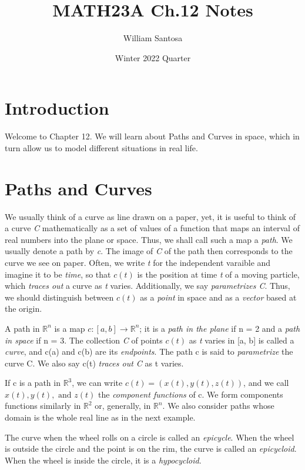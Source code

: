 \documentclass[12pt, letterpaper]{article}
\title{\vspace{-0.4cm}MATH23A Ch.12 Notes}
\author{\vspace{-0.4cm}William Santosa}
\date{\vspace{-0.4cm}Winter 2022 Quarter}
\begin{document}
\maketitle

\section{Introduction}

Welcome to Chapter 12. We will learn about Paths and Curves in space, which in turn allow us to model different situations in real life. 

\section{Paths and Curves}

We usually think of a curve as line drawn on a paper, yet, it is useful to think of a curve \textit{C} mathematically as a set of values of a function that maps an interval of real numbers into the plane or space. Thus, we shall call such a map a \textit{path}. 
We usually denote a path by \textit{c}. The image of \textit{C} of the path then corresponds to the curve we see on paper. Often, we write \textit{t} for the independent varaible and imagine it to be \textit{time}, so that \(c(t)\) is the position at time \textit{t} of a moving particle, which \textit{traces out} a curve as \textit{t} varies. Additionally, we say \textit{parametrizes C}. Thus, we should distinguish between \(c(t)\) as a \textit{point} in space and as a \textit{vector} based at the origin.

A path in \(\mathbb{R}^n\) is a map \(c: [a, b] \rightarrow \mathbb{R}^n\); it is a \textit{path in the plane} if n = 2 and a \textit{path in space} if n = 3. The collection \textit{C} of points \(c(t)\) as \textit{t} varies in [a, b] is called a \textit{curve}, and c(a) and c(b) are its \textit{endpoints}. The path c is said to \textit{parametrize} the curve C. We also say c(t) \textit{traces out C} as t varies.

If c is a path in \(\mathbb{R}^3\), we can write \(c(t) = (x(t), y(t), z(t))\), and we call \(x(t), y(t), \text{ and } z(t)\) the \textit{component functions} of c. We form components functions similarly in \(\mathbb{R}^2\) or, generally, in \(\mathbb{R}^n\). We also consider paths whose domain is the whole real line as in the next example.

The curve when the wheel rolls on a circle is called an \textit{epicycle}. When the wheel is outside the circle and the point is on the rim, the curve is called an \textit{epicycloid}. When the wheel is inside the circle, it is a \textit{hypocycloid}.
\end{document}
